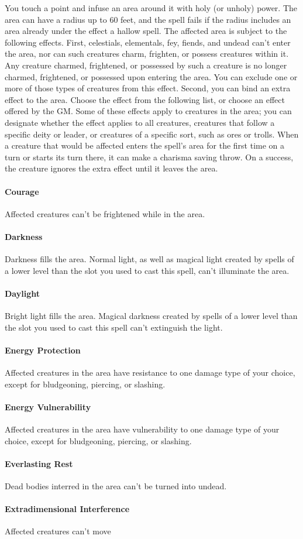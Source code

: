 \documentclass[a5paper, 12pt]{memoir}
\begin{document}
\vspace{1\baselineskip}\noindent You touch a point and infuse an area around it with holy (or unholy) power. The area can have a radius up to 60 feet, and the spell fails if the radius includes an area already under the effect a hallow spell. The affected area is subject to the following effects. First, celestials, elementals, fey, fiends, and undead can't enter the area, nor can such creatures charm, frighten, or possess creatures within it. Any creature charmed, frightened, or possessed by such a creature is no longer charmed, frightened, or possessed upon entering the area. You can exclude one or more of those types of creatures from this effect. Second, you can bind an extra effect to the area. Choose the effect from the following list, or choose an effect offered by the GM. Some of these effects apply to creatures in the area; you can designate whether the effect applies to all creatures, creatures that follow a specific deity or leader, or creatures of a specific sort, such as ores or trolls. When a creature that would be affected enters the spell's area for the first time on a turn or starts its turn there, it can make a charisma saving throw. On a success, the creature ignores the extra effect until it leaves the area. \paragraph{Courage} Affected creatures can't be frightened while in the area. \paragraph{Darkness} Darkness fills the area. Normal light, as well as magical light created by spells of a lower level than the slot you used to cast this spell, can't illuminate the area. \paragraph{Daylight} Bright light fills the area. Magical darkness created by spells of a lower level than the slot you used to cast this spell can't extinguish the light. \paragraph{Energy Protection} Affected creatures in the area have resistance to one damage type of your choice, except for bludgeoning, piercing, or slashing. \paragraph{Energy Vulnerability} Affected creatures in the area have vulnerability to one damage type of your choice, except for bludgeoning, piercing, or slashing. \paragraph{Everlasting Rest} Dead bodies interred in the area can't be turned into undead. \paragraph{Extradimensional Interference} Affected creatures can't move 
\end{document}
